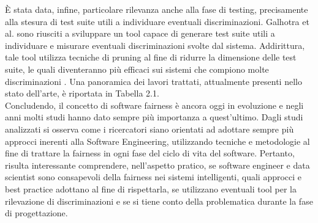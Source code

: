 È stata data, infine, particolare rilevanza anche alla fase di testing, precisamente alla stesura di test suite utili a individuare eventuali discriminazioni. Galhotra et al. sono riusciti a sviluppare un tool capace di generare test suite utili a individuare e misurare eventuali discriminazioni svolte dal sistema. Addirittura, tale tool utilizza tecniche di pruning al fine di ridurre la dimensione delle test suite, le quali diventeranno più efficaci sui sistemi che compiono molte discriminazioni \cite{galhotra2017fairness}. Una panoramica dei lavori trattati, attualmente presenti nello stato dell'arte, è riportata in Tabella 2.1.\\
Concludendo, il concetto di software fairness è ancora oggi in evoluzione e negli anni molti studi hanno dato sempre più importanza a quest'ultimo. Dagli studi analizzati si osserva come i ricercatori siano orientati ad adottare sempre più approcci inerenti alla Software Engineering, utilizzando tecniche e metodologie al fine di trattare la fairness in ogni fase del ciclo di vita del software. Pertanto, risulta interessante comprendere, nell'aspetto pratico, se software engineer e data scientist sono consapevoli della fairness nei sistemi intelligenti, quali approcci e best practice adottano al fine di rispettarla, se utilizzano eventuali tool per la rilevazione di discriminazioni e se si tiene conto della problematica durante la fase di progettazione.
\newpage